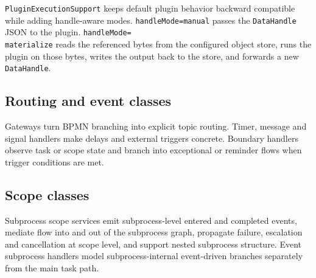 \texttt{PluginExecutionSupport} keeps default plugin behavior backward compatible
while adding handle-aware modes. \texttt{handleMode=manual} passes the
\texttt{DataHandle} JSON to the plugin. \texttt{handleMode=\\materialize} reads the
referenced bytes from the configured object store, runs the plugin on those bytes,
writes the output back to the store, and forwards a new \texttt{DataHandle}.

\subsection{Routing and event classes}

Gateways turn BPMN branching into explicit topic routing. Timer, message and signal handlers
make delays and external triggers concrete. Boundary handlers observe task or scope state and
branch into exceptional or reminder flows when trigger conditions are met.

\subsection{Scope classes}

Subprocess scope services emit subprocess-level entered and completed events, mediate flow
into and out of the subprocess graph, propagate failure, escalation and cancellation at
scope level, and support nested subprocess structure. Event subprocess handlers model
subprocess-internal event-driven branches separately from the main task path.

